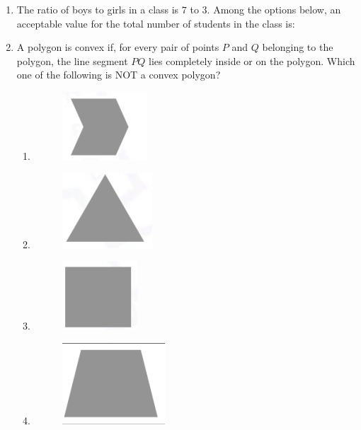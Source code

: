 \documentclass[journal,12pt,onecolumn]{IEEEtran}
\theoremstyle{remark}
\begin{document}
\begin{enumerate}[start=1, label=Q.\arabic*]

\item The ratio of boys to girls in a class is $7$ to $3$.  
Among the options below, an acceptable value for the total number of students in the class is:
\begin{enumerate}
\end{enumerate}

\hfill{}


\item A polygon is convex if, for every pair of points $P$ and $Q$ belonging to the polygon, the line segment $PQ$ lies completely inside or on the polygon.  
Which one of the following is NOT a convex polygon?
\begin{enumerate}
\item \begin{figure}[H]\includegraphics[width=0.15\columnwidth]{Figures/qt2a.png}\caption*{}\end{figure}
\item \begin{figure}[H]\includegraphics[width=0.15\columnwidth]{Figures/qn2b.png}\caption*{}\end{figure}
\item \begin{figure}[H]\includegraphics[width=0.15\columnwidth]{Figures/qn2c.png}\caption*{}\end{figure}
\item \begin{figure}[H]\includegraphics[width=0.15\columnwidth]{Figures/qn2d.png}\caption*{}\end{figure}
\end{enumerate}


\end{enumerate}
\end{document}
